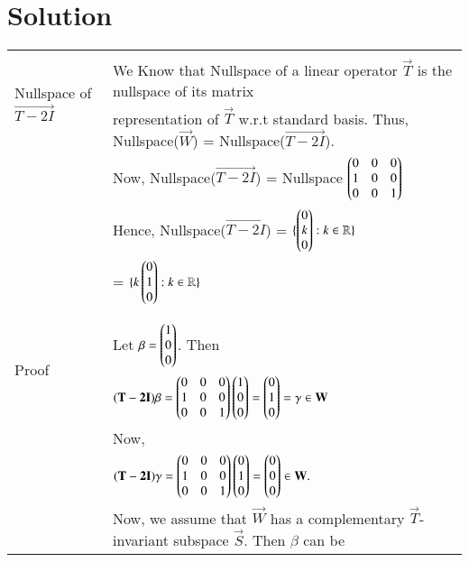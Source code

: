 \documentclass[journal,12pt,twocolumn]{IEEEtran}
\begin{document}
\section{Solution}
\begin{table}[hp]
	\begin{tabular}{|l|l|}
		\hline
		\multirow{3}{*}{Nullspace of $\vec{T-2I}$ } & \\
		& We Know that Nullspace of a linear operator $\vec{T}$ is the nullspace of its matrix \\
		& representation of $\vec{T}$ w.r.t standard basis. Thus, Nullspace($\vec{W}$) = Nullspace($\vec{T-2I}$). \\
		& Now, Nullspace($\vec{T-2I}$) =  Nullspace $\begin{pmatrix}0 & 0 & 0 \\  1 & 0 & 0 \\ 0 & 0 &1 \end{pmatrix}$\\
		&  Hence, Nullspace($\vec{T-2I}$) = $\{ \begin{pmatrix}0 \\ k \\ 0\end{pmatrix}: k \in \mathbb{R}\}$\\
		&\qquad \qquad \qquad \qquad \qquad \quad = $\{k\begin{pmatrix}0 \\ 1 \\ 0\end{pmatrix}:k \in \mathbb{R} \}$ \\
		& \\
		\hline
		\multirow{3}{*}{ \qquad Proof} & \\
		& Let $\beta = \begin{pmatrix}1 \\ 0 \\0\end{pmatrix}$. Then\\
        & \qquad \qquad \qquad $ (\mathbf{T-2I})\beta = \begin{pmatrix}0 & 0 & 0 \\  1 & 0 & 0 \\ 0 & 0 & 1\end{pmatrix}\begin{pmatrix}1 \\ 0 \\0\end{pmatrix} = \begin{pmatrix}0 \\ 1 \\ 0\end{pmatrix} = \gamma \in \mathbf{W} $ \\
    	& Now, \\
        & \qquad \qquad \qquad $ (\mathbf{T-2I})\gamma = \begin{pmatrix}0 & 0 & 0 \\  1 & 0 & 0 \\ 0 & 0 & 1\end{pmatrix}\begin{pmatrix}0 \\ 1 \\0\end{pmatrix} = \begin{pmatrix}0 \\ 0 \\ 0\end{pmatrix} \in \mathbf{W}. $\\
        & Now, we assume that $\vec{W}$ has a complementary $\vec{T}$-invariant subspace $\vec{S}$. Then $\beta$ can be  \\

\end{tabular}
\end{table}
\end{document}
